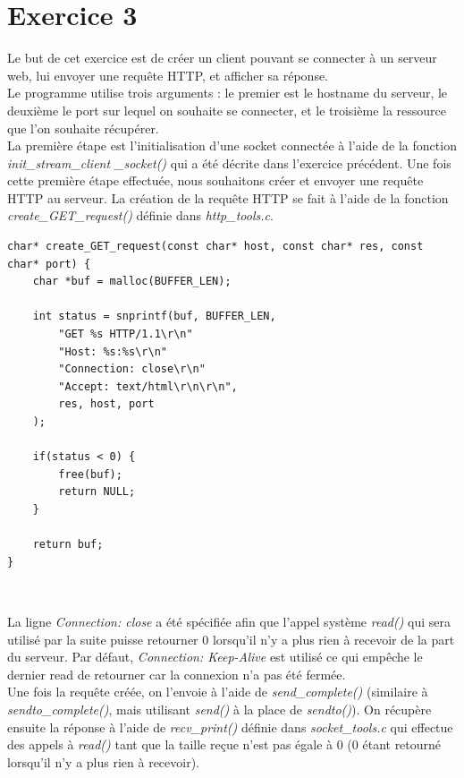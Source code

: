 \section{Exercice 3}
Le but de cet exercice est de créer un client pouvant se connecter à un serveur web, lui envoyer une requête HTTP, et afficher sa réponse.\\

Le programme utilise trois arguments : le premier est le hostname du serveur, le deuxième le port sur lequel on souhaite se connecter, et le troisième la ressource que l'on souhaite récupérer.\\

La première étape est l'initialisation d'une socket connectée à l'aide de la fonction \emph{init\_stream\_client \_socket()} qui a été décrite dans l'exercice précédent. Une fois cette première étape effectuée, nous souhaitons créer et envoyer une requête HTTP au serveur. La création de la requête HTTP se fait à l'aide de la fonction \emph{create\_GET\_request()} définie dans \emph{http\_tools.c}.\\

\begin{lstlisting}
char* create_GET_request(const char* host, const char* res, const char* port) {
    char *buf = malloc(BUFFER_LEN);

    int status = snprintf(buf, BUFFER_LEN,
        "GET %s HTTP/1.1\r\n"
        "Host: %s:%s\r\n"
        "Connection: close\r\n"
        "Accept: text/html\r\n\r\n",
        res, host, port
    );

    if(status < 0) {
        free(buf);
        return NULL;
    }

    return buf;
}
\end{lstlisting}
\

La ligne \emph{Connection: close} a été spécifiée afin que l'appel système \emph{read()} qui sera utilisé par la suite puisse retourner 0 lorsqu'il n'y a plus rien à recevoir de la part du serveur. Par défaut, \emph{Connection: Keep-Alive} est utilisé ce qui empêche le dernier read de retourner car la connexion n'a pas été fermée.\\

Une fois la requête créée, on l'envoie à l'aide de \emph{send\_complete()} (similaire à \emph{sendto\_complete()}, mais utilisant \emph{send()} à la place de \emph{sendto()}). On récupère ensuite la réponse à l'aide de \emph{recv\_print()} définie dans \emph{socket\_tools.c} qui effectue des appels à \emph{read()} tant que la taille reçue n'est pas égale à 0 (0 étant retourné lorsqu'il n'y a plus rien à recevoir).\\


